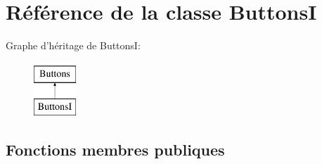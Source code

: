 \hypertarget{classButtonsI}{\section{Référence de la classe Buttons\+I}
\label{classButtonsI}
}
Graphe d'héritage de Buttons\+I\+:\begin{figure}[H]
\begin{center}
\leavevmode
\includegraphics[height=2.000000cm]{classButtonsI}
\end{center}
\end{figure}
\subsection*{Fonctions membres publiques}
